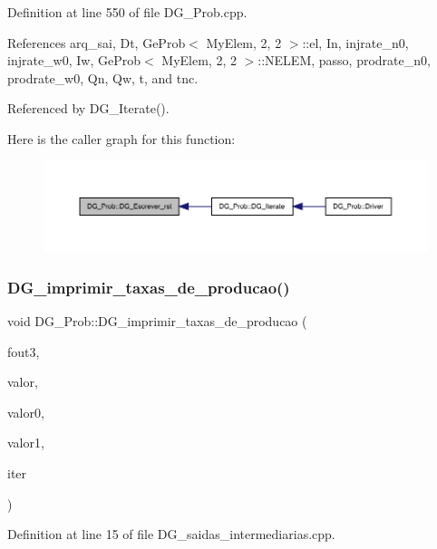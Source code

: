 Definition at line 550 of file D\+G\+\_\+\+Prob.\+cpp.



References arq\+\_\+sai, Dt, Ge\+Prob$<$ My\+Elem, 2, 2 $>$\+::el, In, injrate\+\_\+n0, injrate\+\_\+w0, Iw, Ge\+Prob$<$ My\+Elem, 2, 2 $>$\+::\+N\+E\+L\+EM, passo, prodrate\+\_\+n0, prodrate\+\_\+w0, Qn, Qw, t, and tnc.



Referenced by D\+G\+\_\+\+Iterate().

Here is the caller graph for this function\+:
\nopagebreak
\begin{figure}[H]
\begin{center}
\leavevmode
\includegraphics[width=350pt]{classDG__Prob_a743c25d9cab0343541fccea15cae73a1_icgraph}
\end{center}
\end{figure}
\mbox{\label{classDG__Prob_afd8b8c1330587f232b2f1bd9f9cc8a38}} 
\subsubsection{\texorpdfstring{D\+G\+\_\+imprimir\+\_\+taxas\+\_\+de\+\_\+producao()}{DG\_imprimir\_taxas\_de\_producao()}}
{\footnotesize\ttfamily void D\+G\+\_\+\+Prob\+::\+D\+G\+\_\+imprimir\+\_\+taxas\+\_\+de\+\_\+producao (\begin{DoxyParamCaption}\item[{F\+I\+LE $\ast$}]{fout3,  }\item[{double}]{valor,  }\item[{double}]{valor0,  }\item[{double}]{valor1,  }\item[{int}]{iter }\end{DoxyParamCaption})}



Definition at line 15 of file D\+G\+\_\+saidas\+\_\+intermediarias.\+cpp.



